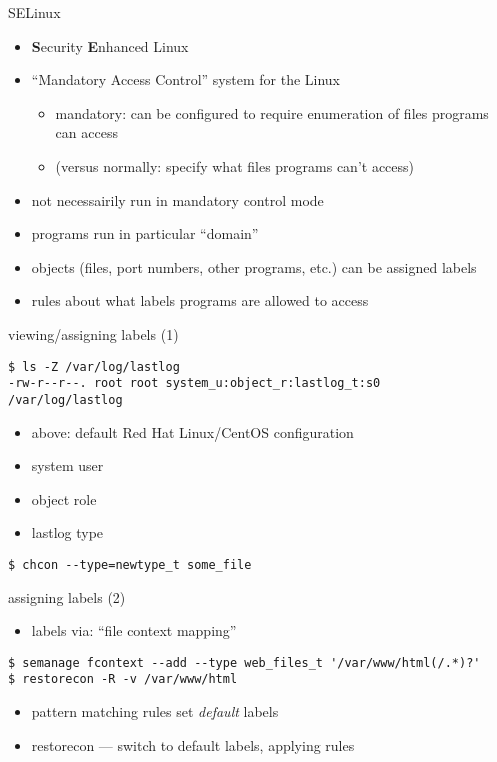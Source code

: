 \begin{frame}{SELinux}
    \begin{itemize}
    \item \textbf{S}ecurity \textbf{E}nhanced Linux
    \item ``Mandatory Access Control'' system for the Linux
        \begin{itemize}
        \item mandatory: can be configured to require enumeration of files programs can access
        \item (versus normally: specify what files programs can't access)
        \end{itemize}
    \item not necessairily run in mandatory control mode
    \vspace{.5cm}
    \item programs run in particular ``domain''
    \item objects (files, port numbers, other programs, etc.) can be assigned labels
    \item rules about what labels programs are allowed to access
    \end{itemize}
\end{frame}

\begin{frame}[fragile,label=selinuxLabels1]{viewing/assigning labels (1)}
\begin{Verbatim}
$ ls -Z /var/log/lastlog
-rw-r--r--. root root system_u:object_r:lastlog_t:s0   /var/log/lastlog
\end{Verbatim}
\begin{itemize}
\item above: default Red Hat Linux/CentOS configuration
\item system user
\item object role
\item lastlog type
\end{itemize}
\begin{Verbatim}
$ chcon --type=newtype_t some_file
\end{Verbatim}
\end{frame}

\begin{frame}[fragile,label=selinuxLabels2]{assigning labels (2)}
\begin{itemize}
\item labels via: ``file context mapping''
\end{itemize}
\begin{Verbatim}
$ semanage fcontext --add --type web_files_t '/var/www/html(/.*)?'
$ restorecon -R -v /var/www/html
\end{Verbatim}
\begin{itemize}
\item pattern matching rules set \textit{default} labels
\item restorecon --- switch to default labels, applying rules
\end{itemize}
\end{frame}

